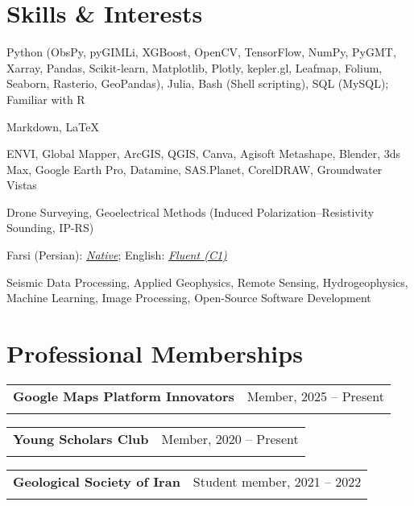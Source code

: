 \documentclass[letterpaper,11pt]{article}
\makeatletter
\newcommand{\ressubheading}[4]{%
	\begin{tabular*}{6.5in}{l@{\cftdotfill{\cftsecdotsep}\extracolsep{\fill}}r}
		\textbf{#1} & #2 \\
		\textit{#3} & \textit{#4} \\
	\end{tabular*}\vspace{-8pt}
}
\makeatother
\begin{document}
	\section{Skills \& Interests}
	\begin{description}[itemsep=0pt]
		
		\item[Programming Languages:] 
		Python (ObsPy, pyGIMLi, XGBoost, OpenCV, TensorFlow, NumPy, PyGMT, Xarray, Pandas, Scikit-learn, Matplotlib, Plotly, kepler.gl, Leafmap, Folium, Seaborn, Rasterio, GeoPandas), Julia, Bash (Shell scripting), SQL (MySQL); Familiar with R
		
		\item[Markup Languages:] 
		Markdown, \LaTeX
		
		\item[Software:] 
		ENVI, Global Mapper, ArcGIS, QGIS, Canva, Agisoft Metashape, Blender, 3ds Max, Google Earth Pro, Datamine, SAS.Planet, CorelDRAW, Groundwater Vistas
		
		\item[Field Techniques:] 
		Drone Surveying, Geoelectrical Methods (Induced Polarization–Resistivity Sounding, IP-RS)
		
		\item[Languages:] 
		Farsi (Persian): \textit{\underline{Native}}; English: \textit{\underline{Fluent (C1)}}
		
		\item[Research Interests:] 
		Seismic Data Processing, Applied Geophysics, Remote Sensing, Hydrogeophysics, Machine Learning, Image Processing, Open-Source Software Development
		
	\end{description}
	\vspace{-2.0em} 
	
	\section{Professional Memberships}
	\vspace{-0.5em} 
	\ressubheading{Google Maps Platform Innovators}{Member, 2025 – Present}{}{}
	\vspace{-0.2em} 
	\vspace{-0.5em} 
	\ressubheading{Young Scholars Club}{Member, 2020 – Present}{}{}
	\vspace{-0.2em} 
	\vspace{-0.5em} 
	\ressubheading{Geological Society of Iran}{Student member, 2021 – 2022}{}{}
	\vspace{2em} 

	
\end{document}
